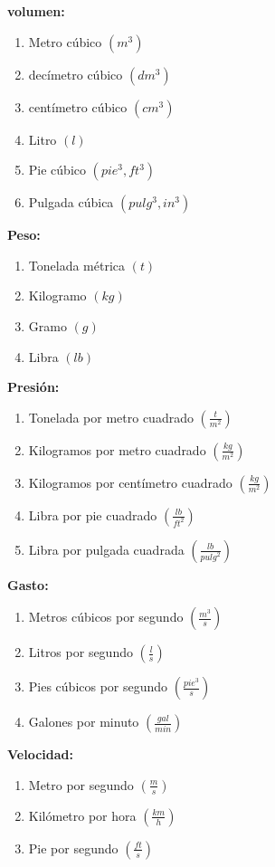 \begin{multicols*}{2}
	\textbf{volumen:}
	\begin{enumerate}
		\item Metro cúbico $(m^3)$
		\item decímetro cúbico $(dm^3)$
		\item centímetro cúbico $(cm^3)$
		\item Litro $\left( l \right) $
		\item Pie cúbico  $(pie^3,ft^3)$
		\item Pulgada cúbica $(pulg^3, in^3)$
	\end{enumerate}

	\textbf{Peso:}
	\begin{enumerate}
		\item Tonelada métrica $(t)$
		\item Kilogramo $(kg)$
		\item Gramo $(g)$
		\item Libra $(lb)$
	\end{enumerate}

	\textbf{Presión:}
	\begin{enumerate}
		\item Tonelada por metro cuadrado $\left(\frac{t}{m^2 }\right) $
		\item Kilogramos por metro cuadrado $\left(\frac{kg}{m^2 }\right) $
		\item Kilogramos por centímetro cuadrado $\left(\frac{kg}{m^2 }\right) $
		\item Libra por pie cuadrado $\left(\frac{lb}{ft^2 }\right) $
		\item Libra por pulgada cuadrada $\left(\frac{lb}{pulg^2 }\right) $
	\end{enumerate}

	\textbf{Gasto:}
	\begin{enumerate}
		\item Metros cúbicos por segundo $\left(\frac{m^3}{s}\right) $
		\item Litros por segundo $\left(\frac{l}{s}\right)$
		\item Pies cúbicos por segundo $\left(\frac{pie^3}{s}\right) $
		\item Galones por minuto $\left(\frac{gal}{min}\right) $
	\end{enumerate}

	\textbf{Velocidad:}
	\begin{enumerate}
		\item Metro por segundo $\left(\frac{m}{s}\right) $
		\item Kilómetro por hora $\left(\frac{km}{h}\right) $
		\item Pie por segundo $\left(\frac{ft}{s}\right) $
	\end{enumerate}
\end{multicols*}


